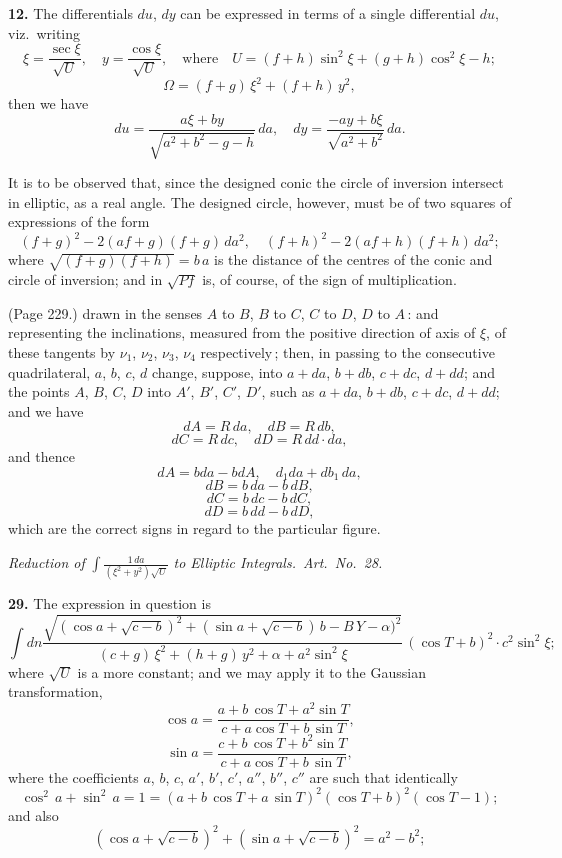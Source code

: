 \documentclass[11pt,a4paper]{book}
\begin{document}
\medskip

\noindent\textbf{12.} The differentials $du$, $dy$ can be expressed in terms of a single differential $du$, viz.\ writing
\[
\xi = \frac{\sec\xi}{\sqrt{U}}, \quad y = \frac{\cos\xi}{\sqrt{U}}, \quad \text{where} \quad U = (f + h)\sin^2 \xi + (g + h)\cos^2\xi - h;
\]
\[
\Omega = (f + g)\,\xi^2 + (f + h)\,y^2,
\]
then we have
\[
du = \frac{a\xi + b y}{\sqrt{a^2 + b^2 - g - h}}\,d a, \quad dy = \frac{- a y + b \xi}{\sqrt{a^2 + b^2}}\,d a.
\]

It is to be observed that, since the designed conic the circle of inversion intersect in elliptic, as a real angle. The designed circle, however, must be of two squares of expressions of the form
\[
(f + g)^2 - 2(a f + g)(f + g)\,da^2, \quad (f + h)^2 - 2(a f + h)(f + h)\,da^2;
\]
where $\sqrt{(f + g)(f + h)} = b\,a$ is the distance of the centres of the conic and circle of inversion; and in $\sqrt{P f}$ is, of course, of the sign of multiplication.

\medskip

\noindent (Page 229.) drawn in the senses $A$ to $B$, $B$ to $C$, $C$ to $D$, $D$ to $A$\,: and representing the inclinations, measured from the positive direction of axis of $\xi$, of these tangents by $\nu_1$, $\nu_2$, $\nu_3$, $\nu_4$ respectively\,; then, in passing to the consecutive quadrilateral, $a$, $b$, $c$, $d$ change, suppose, into $a + da$, $b + db$, $c + dc$, $d + dd$; and the points $A$, $B$, $C$, $D$ into $A'$, $B'$, $C'$, $D'$, such as $a + da$, $b + db$, $c + dc$, $d + dd$; and we have
\[
d A = R\,da, \quad dB = R\,db,
\]
\[
d C = R\,dc, \quad dD = R\,dd \cdot da,
\]
and thence
\[
dA = b da - b dA, \quad d_1 d a + db_1\,d a,
\]
\[
dB = b\,da - b\,d B,
\]
\[
dC = b\,dc - b\,d C,
\]
\[
dD = b\,dd - b\,d D,
\]
which are the correct signs in regard to the particular figure.

\bigskip

\noindent\textit{Reduction of} $\int \frac{1\,d a}{(\xi^2 + y^2)\sqrt{U}}$ \textit{to Elliptic Integrals.\ Art.\ No.\ 28.}

\medskip

\noindent\textbf{29.} The expression in question is
\[
\int dn \frac{\sqrt{(\cos a + \sqrt{c - b})^2 + (\sin a + \sqrt{c - b})\,b - B\,Y - \alpha)^2}}{(c + g)\,\xi^2 + (h + g)\,y^2 + \alpha + a^2 \sin^2 \xi}\,(\cos T + b)^2 \cdot c^2 \sin^2 \xi;
\]
where $\sqrt{U}$ is a more constant; and we may apply it to the Gaussian transformation,
\[
\cos a = \frac{a + b\,\cos T + a^2 \sin T}{c + a\cos T + b\,\sin T},
\]
\[
\sin a = \frac{c + b\,\cos T + b^2 \sin T}{c + a \cos T + b\,\sin T},
\]
where the coefficients $a$, $b$, $c$, $a'$, $b'$, $c'$, $a''$, $b''$, $c''$ are such that identically
\[
\cos^2\,a + \sin^2\,a = 1 = (a + b\,\cos T + a\,\sin T)^2(\cos T + b)^2(\cos T - 1);
\]
and also
\[
(\cos a + \sqrt{c - b})^2 + (\sin a + \sqrt{c - b})^2 = a^2 - b^2;
\]
\end{document}
